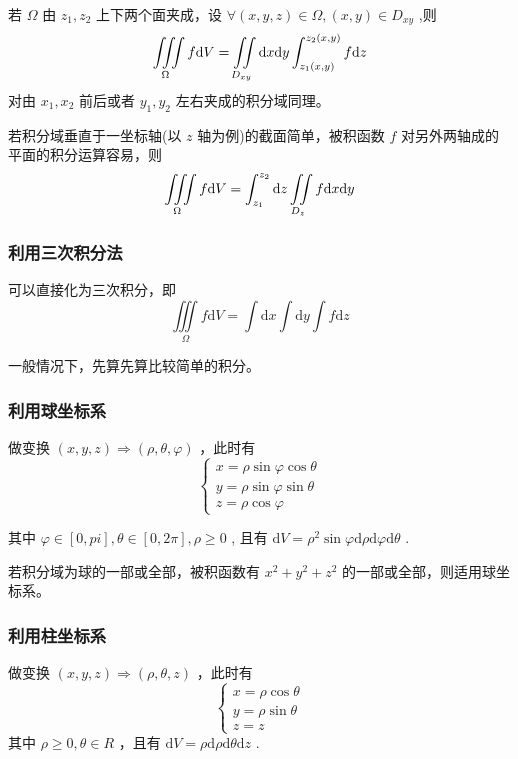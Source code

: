 若 $ \Omega $ 由 $ z_1,z_2 $ 上下两个面夹成，设 $ \forall (x,y,z) \in \Omega, (x,y)\in D_{xy} $ ,则
$$ \displaystyle \iiint\limits_\Omega f\mathrm{d}V = \iint\limits_{D_{xy}}
\mathrm{d}x\mathrm{d}y\int_{z_1(x,y)}^{z_2(x,y)}f\mathrm{d}z $$ 
对由 $ x_1,x_2 $ 前后或者 $ y_1,y_2 $ 左右夹成的积分域同理。

若积分域垂直于一坐标轴(以 $ z $ 轴为例)的截面简单，被积函数 $ f $ 对另外两轴成的平面的积分运算容易，则
$$ \displaystyle \iiint\limits_\Omega f\mathrm{d}V = \int_{z_1}^{z_2}\mathrm{d}z
\iint\limits_{D_{z}}f\mathrm{d}x\mathrm{d}y  $$

\subsubsection{利用三次积分法}

可以直接化为三次积分，即$$
    \iiint\limits_\Omega f\mathrm{d}V =
    \int \mathrm{d}x \int \mathrm{d}y \int f\mathrm{d}z
$$ 

一般情况下，先算先算比较简单的积分。

\subsubsection{利用球坐标系}

做变换 $ (x,y,z)\Rightarrow (\rho,\theta,\varphi) $ ，此时有
$$
    \begin{cases}
        x = \rho\sin \varphi\cos \theta\\ 
        y = \rho\sin \varphi\sin \theta\\ 
        z = \rho\cos \varphi
    \end{cases}
$$ 

其中 $ \varphi\in[0,pi],\theta\in[0,2\pi],\rho\geq0 $ ,
且有 $ \mathrm{d}V = \rho^2\sin\varphi \mathrm{d}\rho \mathrm{d}\varphi\mathrm{d}\theta $ .

若积分域为球的一部或全部，被积函数有 $ x^2+y^2+z^2 $ 的一部或全部，则适用球坐标系。

\subsubsection{利用柱坐标系}

做变换 $ (x,y,z)\Rightarrow (\rho,\theta,z) $ ，此时有
$$
    \begin{cases}
        x = \rho\cos \theta\\ 
        y = \rho\sin \theta\\ 
        z = z
    \end{cases}
$$ 
其中 $ \rho\geq 0,\theta \in R $ ，且有 $ \mathrm{d}V = \rho \mathrm{d}\rho \mathrm{d}\theta \mathrm{d}z $ .

